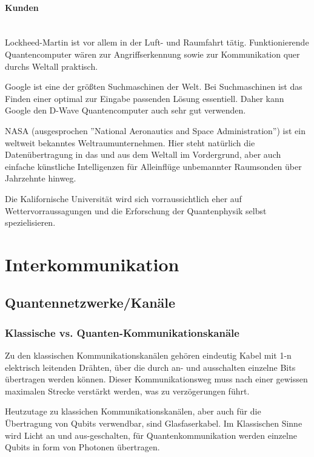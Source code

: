 \paragraph{Kunden} ~\\

Lockheed-Martin ist vor allem in der Luft- und Raumfahrt tätig. Funktionierende Quantencomputer wären zur Angriffserkennung sowie zur Kommunikation quer durchs Weltall praktisch.

Google ist eine der größten Suchmaschinen der Welt. Bei Suchmaschinen ist das Finden einer optimal zur Eingabe passenden Lösung essentiell. Daher kann Google den D-Wave Quantencomputer auch sehr gut verwenden.

NASA (ausgesprochen ''National Aeronautics and Space Administration'') ist ein weltweit bekanntes Weltraumunternehmen. Hier steht natürlich die Datenübertragung in das und aus dem Weltall im Vordergrund, aber auch einfache künstliche Intelligenzen für Alleinflüge unbemannter Raumsonden über Jahrzehnte hinweg.

Die Kalifornische Universität wird sich vorraussichtlich eher auf Wettervorraussagungen und die Erforschung der Quantenphysik selbst spezielisieren.

\newpage

\section{Interkommunikation}
\label{sec:interkommunikation}

\subsection{Quantennetzwerke/Kanäle}
\label{sec:Quantennetzwerke/Kanaele}

\subsubsection{Klassische vs. Quanten-Kommunikationskanäle}
\label{sec:Klassische vs. Quanten-Kommunikationskanaele}

Zu den klassischen Kommunikationskanälen gehören eindeutig Kabel mit 1-n elektrisch leitenden Drähten, über die durch an- und ausschalten einzelne Bits übertragen werden können. Dieser Kommunikationsweg muss nach einer gewissen maximalen Strecke verstärkt werden, was zu verzögerungen führt.

Heutzutage zu klassichen Kommunikationskanälen, aber auch für die Übertragung von Qubits verwendbar, sind Glasfaserkabel. Im Klassischen Sinne wird Licht an und aus-geschalten, für Quantenkommunikation werden einzelne Qubits in form von Photonen übertragen.

